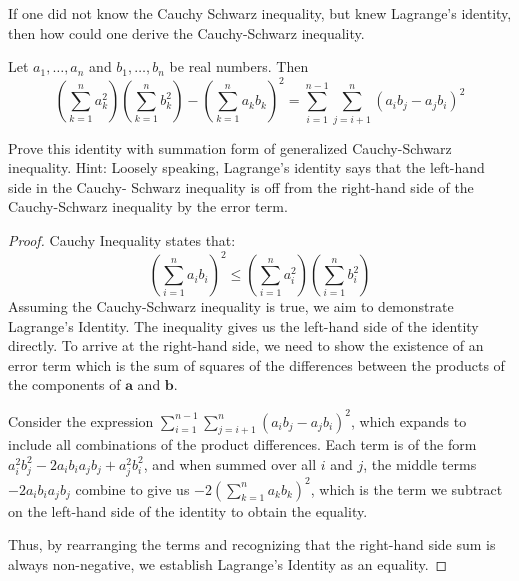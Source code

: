 \documentclass[
	12pt, %
	fleqn, %
	a4paper, %
]{LegrandOrangeBook}
\begin{document}
    \begin{exercise}
        If one did not know the Cauchy Schwarz inequality, but knew Lagrange's identity, then how could one derive the Cauchy-Schwarz inequality.
        \begin{theorem}
            Let \( a_1, \ldots, a_n \) and \( b_1, \ldots, b_n \) be real numbers. Then
            \[
                \left(\sum_{k=1}^{n} a_{k}^{2}\right)\left(\sum_{k=1}^{n} b_{k}^{2}\right)-\left(\sum_{k=1}^{n} a_{k} b_{k}\right)^{2}=\sum_{i=1}^{n-1} \sum_{j=i+1}^{n}\left(a_{i} b_{j}-a_{j} b_{i}\right)^{2}
\]
        \end{theorem}
        Prove this identity with summation form of generalized Cauchy-Schwarz inequality. Hint: Loosely speaking, Lagrange's identity says that the left-hand side in the Cauchy-
        Schwarz inequality is off from the right-hand side of the Cauchy-Schwarz inequality
        by the error term.
    \end{exercise}
    \begin{proof}
    Cauchy Inequality states that: $$\left(\sum_{i=1}^{n} a_{i} b_{i}\right)^{2} \leq\left(\sum_{i=1}^{n} a_{i}^{2}\right)\left(\sum_{i=1}^{n} b_{i}^{2}\right)$$
    Assuming the Cauchy-Schwarz inequality is true, we aim to demonstrate Lagrange's Identity. The inequality gives us the left-hand side of the identity directly. To arrive at the right-hand side, we need to show the existence of an error term which is the sum of squares of the differences between the products of the components of \( \mathbf{a} \) and \( \mathbf{b} \).

Consider the expression \( \sum_{i=1}^{n-1} \sum_{j=i+1}^{n} (a_i b_j - a_j b_i)^2 \), which expands to include all combinations of the product differences. Each term is of the form \( a_i^2 b_j^2 - 2 a_i b_i a_j b_j + a_j^2 b_i^2 \), and when summed over all \( i \) and \( j \), the middle terms \( -2 a_i b_i a_j b_j \) combine to give us \( -2 \left( \sum_{k=1}^{n} a_k b_k \right)^2 \), which is the term we subtract on the left-hand side of the identity to obtain the equality.

Thus, by rearranging the terms and recognizing that the right-hand side sum is always non-negative, we establish Lagrange's Identity as an equality.

    \end{proof}
\end{document}
